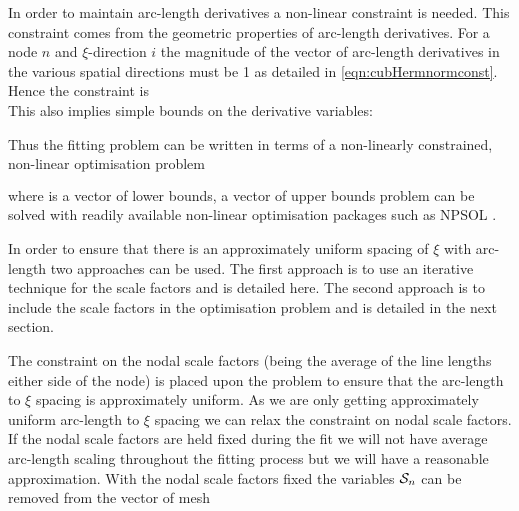 In order to maintain arc-length derivatives a non-linear constraint is needed.
This constraint comes from the geometric properties of arc-length derivatives.
For a node $n$ and $\xi$-direction $i$ the magnitude of the vector of
arc-length derivatives in the various spatial directions must be 1 as detailed
in \eqref{eqn:cubHermnormconst}.  Hence the constraint is
\begin{equation}
  \label{eqn:normconst}
\end{equation}
This also implies simple bounds on the derivative variables:

Thus the fitting problem can be written in terms of a non-linearly constrained,
non-linear optimisation problem
\begin{eqnarray}
  \label{eqn:nloproblem} \\
\end{eqnarray}
where  is a vector of lower bounds,  a vector of upper bounds 
problem can be solved with readily available non-linear optimisation packages 
such as NPSOL \cite{gill:1986}. 

In order to ensure that there is an approximately uniform spacing of $\xi$
with arc-length two approaches can be used. The first approach is to use
an iterative technique for the scale factors and is detailed here. The
second approach is to include the scale factors in the optimisation problem
and is detailed in the next section.

The constraint on the nodal scale factors (being the average of the line
lengths either side of the node) is placed upon the problem to ensure that the
arc-length to $\xi$ spacing is approximately uniform. As we are only getting
approximately uniform arc-length to $\xi$ spacing we can relax the constraint
on nodal scale factors. If the nodal scale factors are held fixed during the
fit we will not have average arc-length scaling throughout the fitting process
but we will have a reasonable approximation. With the nodal scale factors
fixed the variables ${\cal S}_{n}$ can be removed from the vector of mesh

